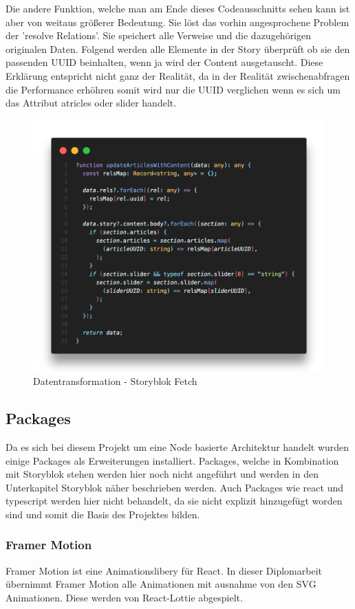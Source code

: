 Die andere Funktion, welche man am Ende dieses Codeausschnitts sehen kann ist aber von weitaus größerer Bedeutung. Sie löst das vorhin angesprochene Problem der 'resolve Relations'. Sie speichert alle Verweise und die dazugehörigen originalen Daten. Folgend werden alle Elemente in der Story überprüft ob sie den passenden UUID beinhalten, wenn ja wird der Content ausgetauscht. Diese Erklärung entspricht nicht ganz der Realität, da in der Realität zwischenabfragen die Performance erhöhren somit wird nur die UUID verglichen wenn es sich um das Attribut atricles oder slider handelt.
\begin{figure}[H]
    \centering
    \includegraphics[width=\linewidth]{pics/sb-fetch-02.png}
    \caption{Datentransformation - Storyblok Fetch}
\end{figure}


\subsection{Packages}
Da es sich bei diesem Projekt um eine Node basierte Architektur handelt wurden einige Packages als Erweiterungen installiert. Packages, welche in Kombination mit Storyblok stehen werden hier noch nicht angeführt und werden in den Unterkapitel Storyblok näher beschrieben werden. Auch Packages wie react und typescript werden hier nicht behandelt, da sie nicht explizit hinzugefügt worden sind und somit die Basis des Projektes bilden.

\subsubsection*{Framer Motion}
Framer Motion ist eine Animationslibery für React. In dieser Diplomarbeit übernimmt Framer Motion alle Animationen mit ausnahme von den SVG Animationen. Diese werden von React-Lottie abgespielt.

